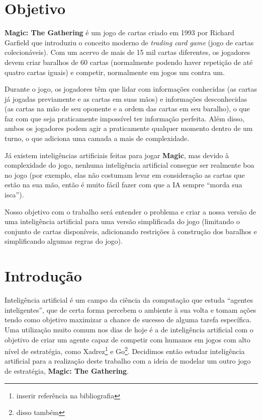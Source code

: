 \documentclass[dvipsnames]{book}
\begin{document}
\chapter*{Objetivo}
\textbf{Magic: The Gathering} é um jogo de cartas criado em 1993 por
Richard Garfield que introduziu o conceito moderno de \textit{trading
card game} (jogo de cartas colecionáveis). Com um acervo de mais de 15
mil cartas diferentes, os jogadores devem criar baralhos de 60 cartas
(normalmente podendo haver repetição de até quatro cartas iguais) e
competir, normalmente em jogos um contra um.
\par Durante o jogo, os jogadores têm que lidar com informações
conhecidas (as cartas já jogadas previamente e as cartas em suas mãos) e
informações desconhecidas (as cartas na mão de seu oponente e a ordem
das cartas em seu baralho), o que faz com que seja praticamente
impossível ter informação perfeita. Além disso, ambos os jogadores podem
agir a praticamente qualquer momento dentro de um turno, o que adiciona
uma camada a mais de complexidade.
\par Já existem inteligências artificiais feitas para jogar
\textbf{Magic}, mas devido à complexidade do jogo, nenhuma inteligência
artificial consegue ser realmente boa no jogo (por exemplo, elas não
costumam levar em consideração as cartas que estão na sua mão, então é
muito fácil fazer com que a IA sempre ``morda sua isca'').
\par Nosso objetivo com o trabalho será entender o problema e criar a
nossa versão de uma inteligência artificial para uma versão simplificada
do jogo (limitando o conjunto de cartas disponíveis, adicionando
restrições à construção dos baralhos e simplificando algumas regras do
jogo).

\chapter{Introdução}

Inteligência artificial é um campo da ciência da computação que estuda
``agentes inteligentes'', que de certa forma percebem o ambiente à sua volta
e tomam ações tendo como objetivo maximizar a chance de sucesso de alguma
tarefa específica. Uma utilização muito comum nos dias de hoje é a de
inteligência artificial com o objetivo de criar um agente capaz de competir
com humanos em jogos com alto nível de estratégia, como Xadrez\footnote{inserir referência
na bibliografia} e Go\footnote{disso também}.
Decidimos então estudar inteligência artificial para a realização deste
trabalho com a ideia de modelar um outro jogo de estratégia,
\textbf{Magic: The Gathering}.
\end{document}
